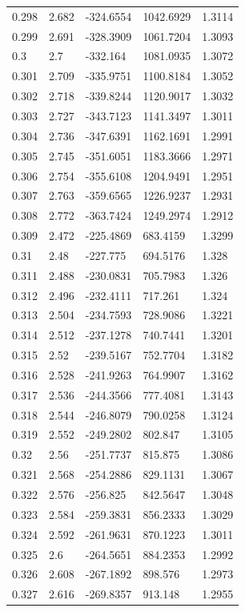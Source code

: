 \begin{tabular}{lllll}
0.298 & 2.682 & -324.6554 & 1042.6929 & 1.3114 \\
0.299 & 2.691 & -328.3909 & 1061.7204 & 1.3093 \\
0.3 & 2.7 & -332.164 & 1081.0935 & 1.3072 \\
0.301 & 2.709 & -335.9751 & 1100.8184 & 1.3052 \\
0.302 & 2.718 & -339.8244 & 1120.9017 & 1.3032 \\
0.303 & 2.727 & -343.7123 & 1141.3497 & 1.3011 \\
0.304 & 2.736 & -347.6391 & 1162.1691 & 1.2991 \\
0.305 & 2.745 & -351.6051 & 1183.3666 & 1.2971 \\
0.306 & 2.754 & -355.6108 & 1204.9491 & 1.2951 \\
0.307 & 2.763 & -359.6565 & 1226.9237 & 1.2931 \\
0.308 & 2.772 & -363.7424 & 1249.2974 & 1.2912 \\
0.309 & 2.472 & -225.4869 & 683.4159 & 1.3299 \\
0.31 & 2.48 & -227.775 & 694.5176 & 1.328 \\
0.311 & 2.488 & -230.0831 & 705.7983 & 1.326 \\
0.312 & 2.496 & -232.4111 & 717.261 & 1.324 \\
0.313 & 2.504 & -234.7593 & 728.9086 & 1.3221 \\
0.314 & 2.512 & -237.1278 & 740.7441 & 1.3201 \\
0.315 & 2.52 & -239.5167 & 752.7704 & 1.3182 \\
0.316 & 2.528 & -241.9263 & 764.9907 & 1.3162 \\
0.317 & 2.536 & -244.3566 & 777.4081 & 1.3143 \\
0.318 & 2.544 & -246.8079 & 790.0258 & 1.3124 \\
0.319 & 2.552 & -249.2802 & 802.847 & 1.3105 \\
0.32 & 2.56 & -251.7737 & 815.875 & 1.3086 \\
0.321 & 2.568 & -254.2886 & 829.1131 & 1.3067 \\
0.322 & 2.576 & -256.825 & 842.5647 & 1.3048 \\
0.323 & 2.584 & -259.3831 & 856.2333 & 1.3029 \\
0.324 & 2.592 & -261.9631 & 870.1223 & 1.3011 \\
0.325 & 2.6 & -264.5651 & 884.2353 & 1.2992 \\
0.326 & 2.608 & -267.1892 & 898.576 & 1.2973 \\
0.327 & 2.616 & -269.8357 & 913.148 & 1.2955 \\

\end{tabular}
